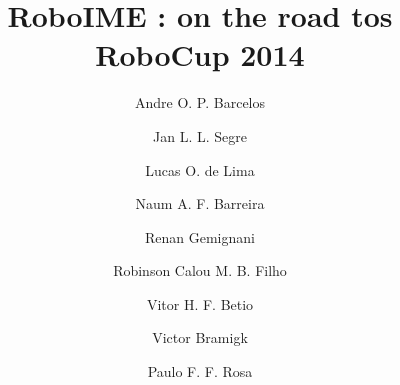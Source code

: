 \documentclass[brazil,english]{llncs}
\begin{document}
\title{RoboIME : on the road tos RoboCup 2014}
\author{
 Andre O. P. Barcelos \and
 Jan L. L. Segre \and
 Lucas O. de Lima \and
 Naum A. F. Barreira \and
 Renan Gemignani \and
 Robinson Calou M. B. Filho \and
 Vitor H. F. Betio \and
 Victor Bramigk \and
 Paulo F. F. Rosa
}

\maketitle



%






\end{document}
